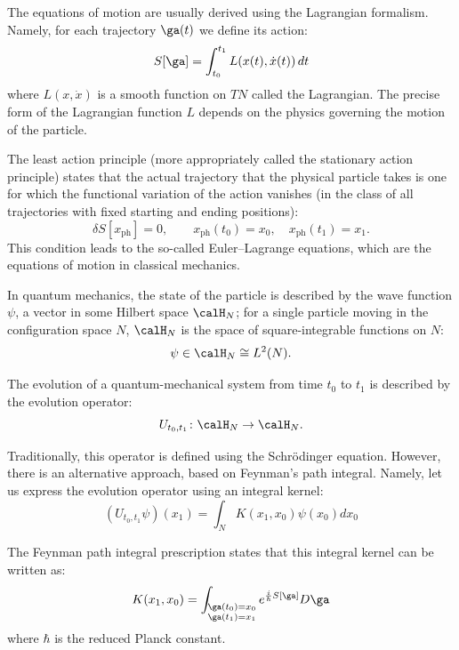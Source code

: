 The equations of motion are usually derived using the Lagrangian formalism.
Namely, for each trajectory $\ga(t)$ we define its action:
\begin{equation}
	S[\ga]= \int_{t_0}^{t_1} L(x(t),\dot x(t))\, dt \nonumber
\end{equation}
where $L(x, \dot x)$ is a smooth function on $TN$ called the Lagrangian.
The precise form of
the Lagrangian function $L$ depends on the physics governing the motion of the
particle.

The least action principle (more appropriately called the stationary action
principle) states that the actual trajectory that the physical particle takes
is one for which the functional variation of the action vanishes (in the class
of all trajectories with fixed starting and ending positions):
\begin{equation}\label{e:stationary-path}
	\delta S[x_{\mathrm{ph}}] = 0, \qquad x_{\mathrm{ph}}(t_0) = x_0,\quad x_{\mathrm{ph}}(t_1) = x_1.
\end{equation}
This condition leads to the so-called Euler--Lagrange equations, which are the
equations of motion in classical mechanics.


In quantum mechanics, the state of the particle is described by the wave
function $\psi$, a vector in some Hilbert space $\calH_N$; for a single
particle moving in the configuration space $N$, $\calH_N$ is the space of
square-integrable functions on $N$:
\begin{equation*}
	\psi \in \calH_N \cong L^2(N).
\end{equation*}

The evolution of a quantum-mechanical system from time $t_0$
to $t_1$ is described by the evolution operator:
\begin{equation*}
	U_{t_0,t_1}\colon \calH_N \to\calH_N.
\end{equation*}

Traditionally, this operator is defined using the Schr\"odinger equation.
However, there is an alternative approach, based on Feynman's path integral.
Namely, let us express the evolution operator using an integral kernel:
\begin{equation}
	(U_{t_0,t_1} \psi)(x_1) = \int_{N} K(x_1,x_0) \psi(x_0) dx_0
\end{equation}

The Feynman path integral prescription states that this integral
kernel can be written as:
\begin{equation}\label{e:feynman1}
	K(x_1,x_0) = \int_{\substack{\ga(t_0)=x_0 \\
  \ga(t_1)=x_1}} e^{ \frac{i}{\hbar} S[\ga] } D\ga
\end{equation}
where $\hbar$ is the reduced Planck constant.

